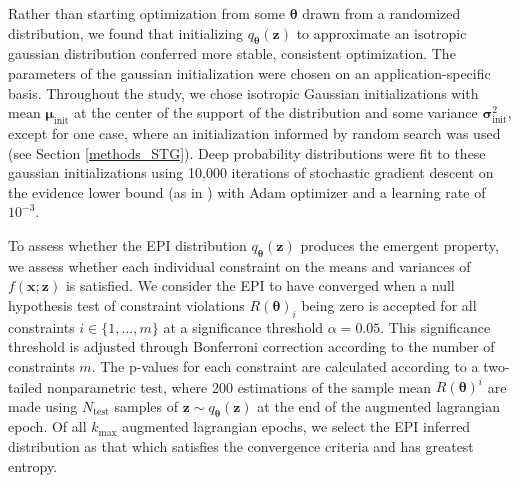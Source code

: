 \documentclass[11pt]{article}
\begin{document}
Rather than starting optimization from some $\bm{\theta}$ drawn from a randomized distribution, we found that initializing $q_{\bm{\theta}}(\mathbf{z})$ to approximate an isotropic gaussian distribution conferred more stable, consistent optimization.  
The parameters of the gaussian initialization were chosen on an application-specific basis.  
Throughout the study, we chose isotropic Gaussian initializations with mean $\bm{\mu}_{\text{init}}$ at the center of the support of the distribution and some variance $\bm{\sigma}_{\text{init}}^2$, except for one case, where an initialization informed by random search was used (see Section \ref{methods_STG}).
Deep probability distributions were fit to these gaussian initializations using 10,000 iterations of stochastic gradient descent on the evidence lower bound (as in \cite{bittner2019approximating}) with Adam optimizer and a learning rate of $10^{-3}$.

To assess whether the EPI distribution $q_{\bm{\theta}}(\mathbf{z})$ produces the emergent property, we assess whether each individual constraint on the means and variances of $f(\mathbf{x}; \mathbf{z})$ is satisfied.
We consider the EPI to have converged when a null hypothesis test of constraint violations $R(\bm{\theta})_i$ being zero is accepted for all constraints $i \in \{1, ..., m\}$ at a significance threshold $\alpha=0.05$. 
This significance threshold is adjusted through Bonferroni correction according to the number of constraints $m$.  
The p-values for each constraint are calculated according to a two-tailed nonparametric test, where 200 estimations of the sample mean $R(\bm{\theta})^i$ are made using $N_{\text{test}}$ samples of $\mathbf{z} \sim q_{\bm{\theta}}(\mathbf{z})$ at the end of the augmented lagrangian epoch.
Of all $k_{\text{max}}$ augmented lagrangian epochs, we select the EPI inferred distribution as that which satisfies the convergence criteria and has greatest entropy.

\end{document}
